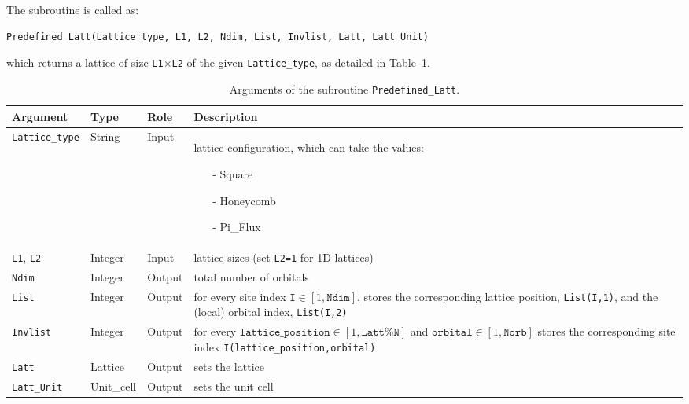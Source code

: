 The subroutine is called as:
\begin{lstlisting}[style=fortran]
Predefined_Latt(Lattice_type, L1, L2, Ndim, List, Invlist, Latt, Latt_Unit)
\end{lstlisting}
which returns a lattice of size \texttt{L1$\times$L2} of the given \texttt{Lattice\_type}, as detailed in Table~\ref{table:predefined_lattices}.
%
\begin{table}[h]
	\begin{center}
	\begin{tabular}{@{} p{}  p{} p{} p{}  @{}}
		\toprule
		Argument                 & Type       & Role   & Description \\
		\midrule
		\texttt{Lattice\_type}   & String     & Input  & lattice configuration, which can take the values:
		\vspace{-\topsep} %
		\begin{itemize}
			\setlength{\itemsep}{0pt} \setlength{\parskip}{0pt} \setlength{\parsep}{0pt}
			\item[-] Square
			\item[-] Honeycomb
			\item[-] Pi\_Flux \vspace{-1.4\topsep}
		\end{itemize} \\
		\texttt{L1}, \texttt{L2} & Integer    & Input  & lattice sizes (set \texttt{L2=1} for 1D lattices)\\
		\texttt{Ndim}            & Integer    & Output & total number of orbitals\\
		\texttt{List}            & Integer    & Output & for every site index $\texttt{I} \in [1,\texttt{Ndim}]$, stores the corresponding lattice position, \texttt{List(I,1)}, and the (local) orbital index, \texttt{List(I,2)}\\
		\texttt{Invlist}         & Integer    & Output &  for every $\texttt{lattice\_position} \in [1,\texttt{Latt\%N}]$ and $\texttt{orbital} \in [1,\texttt{Norb}]$ stores the corresponding site index \texttt{I(lattice\_position,orbital)}\\
		\texttt{Latt}            & Lattice    & Output &  sets the lattice\\
		\texttt{Latt\_Unit}      & Unit\_cell & Output & sets the unit cell\\
		\bottomrule
	\end{tabular}
\caption{Arguments of the subroutine \texttt{Predefined\_Latt}.}		\label{table:predefined_lattices}
\end{center}
\end{table}

